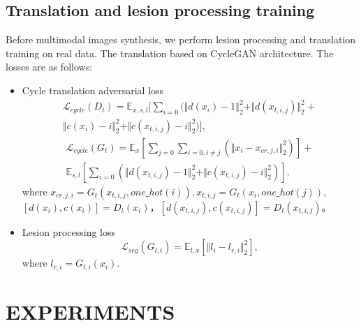 \documentclass[runningheads]{llncs}
\begin{document}
\subsection{Translation and lesion processing training}
Before multimodal images synthesis, we perform lesion processing and translation training on real data. 
The translation based on CycleGAN\cite{6zhu2017unpaired} architecture. The losses are as follows:
\begin{itemize}
	\item{Cycle translation adversarial loss}
	\begin{equation}
	\begin{split}
	\mathcal{L}_{cycle}(D_t)=\mathbb{E}_{x,s,l}[\sum\limits_{i=0}(\Vert{d(x_i)-1}\Vert_{2}^{2}+\Vert{d(x_{t,i,j})}\Vert_{2}^{2}+\\
	\Vert{c(x_i)-i}\Vert_{2}^{2}+\Vert{c(x_{t,i,j})-i}\Vert_{2}^{2})],
	\end{split}
	\end{equation}
	\begin{equation}
	\begin{split}
	\mathcal{L}_{cycle}(G_t)=\mathbb{E}_{x}[\sum\limits_{j=0}\sum\limits_{i=0,i\neq j}(\Vert{x_{i}-x_{cr,j,i}}\Vert_{2}^{2})]+\\\mathbb{E}_{s,l}[\sum\limits_{i=0}(\Vert{d(x_{t,i,j})-1}\Vert_{2}^{2}+\Vert{c(x_{t,i,j})-i}\Vert_{2}^{2})],
	\end{split}
	\end{equation}
	where $x_{cr,j,i}=G_t(x_{t,i,j},one\_hot(i)),x_{t,i,j}=G_t(x_{i},one\_hot(j))$,
	$[d(x_{i}),c(x_{i})]=D_t(x_{i})$，$[d(x_{t,i,j}),c(x_{t,i,j})]=D_t(x_{t,i,j})$。
	
	\item{Lesion processing loss}
	\begin{equation}
	\label{lesion segmentation loss}
	\mathcal{L}_{seg}(G_{l,i})=\mathbb{E}_{l,x}[\Vert{l_i-l_{r,i}}\Vert_{2}^{2}],
	\end{equation}
	where $l_{r,i}=G_{l,i}(x_{i})$.
\end{itemize}

\section{EXPERIMENTS}
\end{document}
